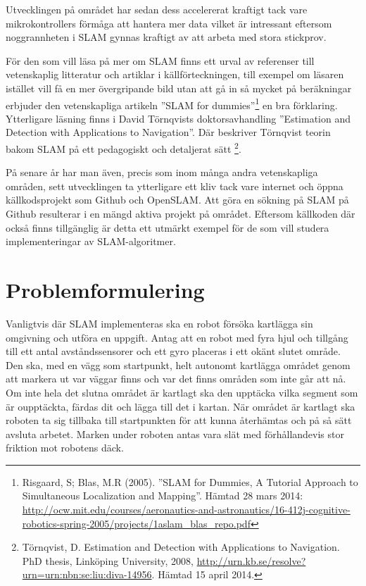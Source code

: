 \documentclass[a4paper,12pt,fleqn]{article}
\begin{document}
Utvecklingen på området har sedan dess accelererat kraftigt tack vare
mikrokontrollers förmåga att hantera mer data vilket är intressant eftersom noggrannheten i SLAM gynnas kraftigt av att arbeta med stora stickprov. 

För den som vill läsa på mer om SLAM finns ett urval av referenser till vetenskaplig litteratur och artiklar i källförteckningen, till exempel om läsaren istället vill få en mer övergripande bild utan att gå in så mycket på beräkningar erbjuder den vetenskapliga artikeln ''SLAM for dummies''\footnote{Risgaard, S; Blas, M.R (2005).
''SLAM for Dummies, A Tutorial Approach to Simultaneous Localization and Mapping''. 
Hämtad 28 mars 2014:
\url{http://ocw.mit.edu/courses/aeronautics-and-astronautics/16-412j-cognitive-robotics-spring-2005/projects/1aslam_blas_repo.pdf}
} en bra förklaring. Ytterligare läsning finns i David Törnqvists doktorsavhandling ''Estimation and Detection with Applications to Navigation''. Där beskriver Törnqvist teorin bakom SLAM på ett pedagogiskt och detaljerat sätt \footnote{Törnqvist, D. Estimation and Detection with Applications to Navigation. PhD thesis, Linköping University, 2008, \url{http://urn.kb.se/resolve?urn=urn:nbn:se:liu:diva-14956}. Hämtad 15 april 2014.}.
 
På senare år har man även, precis som inom många andra vetenskapliga områden, sett utvecklingen ta ytterligare ett kliv tack vare internet och öppna källkodsprojekt som Github och OpenSLAM. Att göra en sökning på SLAM på Github resulterar i en mängd aktiva projekt på området. Eftersom källkoden där också finns tillgänglig är detta ett utmärkt exempel för de som vill studera implementeringar av SLAM-algoritmer. 


\section{Problemformulering}

Vanligtvis där SLAM implementeras ska en robot försöka kartlägga sin omgivning och utföra en uppgift. Antag att en robot med fyra hjul och tillgång till ett antal avståndssensorer och ett gyro placeras i ett okänt slutet område. Den ska, med en vägg som startpunkt, helt autonomt kartlägga området genom att markera ut var väggar finns och var det finns områden som inte går att nå. Om inte hela det slutna området är kartlagt ska den upptäcka vilka segment som är oupptäckta, färdas dit och lägga till det i kartan. När området är kartlagt ska roboten ta sig tillbaka till startpunkten för att kunna återhämtas och på så sätt avsluta arbetet. Marken under roboten antas vara slät med förhållandevis stor friktion mot robotens däck. 
\end{document}
